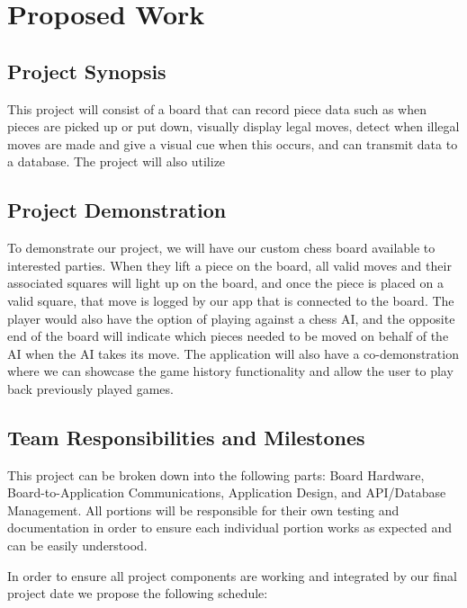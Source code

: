 \documentclass[11pt,journal]{IEEEtran}
\begin{document}



\section{Proposed Work}


\subsection{Project Synopsis}
This project will consist of a board that can record piece data such as when pieces are picked up or put down, visually display legal moves, detect when illegal moves are made and give a visual cue when this occurs, and can transmit data to a database. The project will also utilize 

\subsection{Project Demonstration}
To demonstrate our project, we will have our custom chess board available to interested parties. When they lift a piece on the board, all valid moves and their associated squares will light up on the board, and once the piece is placed on a valid square, that move is logged by our app that is connected to the board. The player would also have the option of playing against a chess AI, and the opposite end of the board will indicate which pieces needed to be moved on behalf of the AI when the AI takes its move. The application will also have a co-demonstration where we can showcase the game history functionality and allow the user to play back previously played games.

\subsection{Team Responsibilities and Milestones}
This project can be broken down into the following parts: Board Hardware, Board-to-Application Communications, Application Design, and API/Database Management. All portions will be responsible for their own testing and documentation in order to ensure each individual portion works as expected and can be easily understood. 

In order to ensure all project components are working and integrated by our final project date we propose the following schedule:
\end{document}

